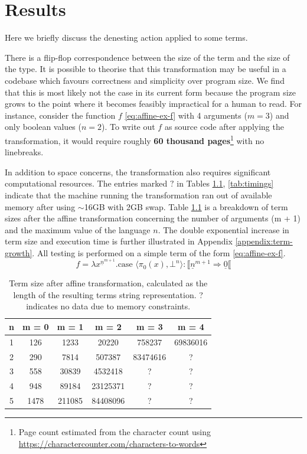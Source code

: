\documentclass[12pt,a4paper]{report}
\theoremstyle{definition}
\theoremstyle{definition}
\theoremstyle{remark}
\begin{document}
\chapter{Results}\label{chapter:results}
Here we briefly discuss the denesting action applied to some terms. 

There is a flip-flop correspondence between the size of the term and the size of the type. It is possible to theorise that this transformation may be useful in a codebase which favours correctness and simplicity over program size. We find that this is most likely not the case in its current form because the program size grows to the point where it becomes feasibly impractical for a human to read. For instance, consider the function $f$ \eqref{eq:affine-ex-f} with 4 arguments ($m=3$) and only boolean values ($n=2$). To write out $f$ as source code after applying the transformation, it would require roughly \textbf{60 thousand pages}\footnote{Page count estimated from the character count using \url{https://charactercounter.com/characters-to-words}} with no linebreaks. 

In addition to space concerns, the transformation also requires significant computational resources. The entries marked $?$ in Tables \ref{tab:affine-term-sizes}, \ref{tab:timings} indicate that the machine running the transformation ran out of available memory after using $\sim$16GB with 2GB swap. Table \ref{tab:affine-term-sizes} is a breakdown of term sizes after the affine transformation concerning the number of arguments (m + 1) and the maximum value of the language $n$. The double exponential increase in term size and execution time is further illustrated in Appendix \ref{appendix:term-growth}. All testing is performed on a simple term of the form \eqref{eq:affine-ex-f}.
\begin{equation}\label{eq:affine-ex-f}
    f =\lambda x^{\underline{n}^{m+1}}. \text{case } \langle \pi_0(x), \bot^n \rangle : \llbracket \underline{n}^{m+1} \Rightarrow \underline{0} \llbracket 
\end{equation}

\begin{table}[h]
  \centering
  \caption{Term size after affine transformation, calculated as the length of the resulting terms string representation. ? indicates no data due to memory constraints.}
  \label{tab:affine-term-sizes}
  \begin{tabular}{c c c c c c}
    \toprule
    \textbf{n} & \textbf{m = 0} & \textbf{m = 1} & \textbf{m = 2} & \textbf{m = 3} & \textbf{m = 4}\\
    \midrule
    1 & 126 & 1233 & 20220 & 758237 & 69836016\\
    2 & 290 & 7814 & 507387 & 83474616 & ?\\
    3 & 558 & 30839 & 4532418 & ? & ?\\
    4 & 948 & 89184 & 23125371 & ? & ?\\
    5 & 1478 & 211085 & 84408096 & ? & ?\\
    \bottomrule
  \end{tabular}
\end{table}
\end{document}
